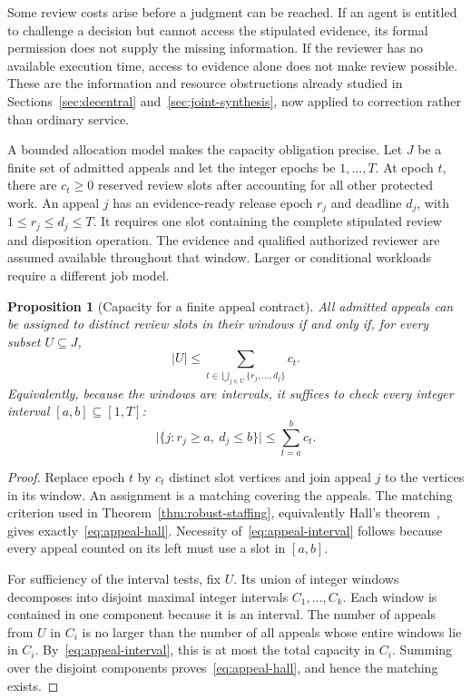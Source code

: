 \documentclass[11pt,letterpaper]{article}
\theoremstyle{plain}
\newtheorem{proposition}{Proposition}[section]
\theoremstyle{definition}
\theoremstyle{remark}
\begin{document}
Some review costs arise before a judgment can be reached. If an agent is entitled to challenge a decision but cannot access the stipulated evidence, its formal permission does not supply the missing information. If the reviewer has no available execution time, access to evidence alone does not make review possible. These are the information and resource obstructions already studied in Sections~\ref{sec:decentral} and~\ref{sec:joint-synthesis}, now applied to correction rather than ordinary service.

A bounded allocation model makes the capacity obligation precise. Let $J$ be a finite set of admitted appeals and let the integer epochs be $1,\ldots,T$. At epoch $t$, there are $c_t\ge0$ reserved review slots after accounting for all other protected work. An appeal $j$ has an evidence-ready release epoch $r_j$ and deadline $d_j$, with $1\le r_j\le d_j\le T$. It requires one slot containing the complete stipulated review and disposition operation. The evidence and qualified authorized reviewer are assumed available throughout that window. Larger or conditional workloads require a different job model.

\begin{proposition}[Capacity for a finite appeal contract]\label{prop:appeal-capacity}
All admitted appeals can be assigned to distinct review slots in their windows if and only if, for every subset $U\subseteq J$,
\begin{equation}\label{eq:appeal-hall}
 |U|\le\sum_{t\in\bigcup_{j\in U}\{r_j,\ldots,d_j\}}c_t.
\end{equation}
Equivalently, because the windows are intervals, it suffices to check every integer interval $[a,b]\subseteq[1,T]$:
\begin{equation}\label{eq:appeal-interval}
 \bigl|\{j:r_j\ge a,\ d_j\le b\}\bigr|
       \le\sum_{t=a}^{b}c_t.
\end{equation}
\end{proposition}
\begin{proof}
Replace epoch $t$ by $c_t$ distinct slot vertices and join appeal $j$ to the vertices in its window. An assignment is a matching covering the appeals. The matching criterion used in Theorem~\ref{thm:robust-staffing}, equivalently Hall's theorem~\cite{hall1935}, gives exactly~\eqref{eq:appeal-hall}. Necessity of~\eqref{eq:appeal-interval} follows because every appeal counted on its left must use a slot in $[a,b]$.

For sufficiency of the interval tests, fix $U$. Its union of integer windows decomposes into disjoint maximal integer intervals $C_1,\ldots,C_k$. Each window is contained in one component because it is an interval. The number of appeals from $U$ in $C_i$ is no larger than the number of all appeals whose entire windows lie in $C_i$. By~\eqref{eq:appeal-interval}, this is at most the total capacity in $C_i$. Summing over the disjoint components proves~\eqref{eq:appeal-hall}, and hence the matching exists.
\end{proof}
\end{document}
